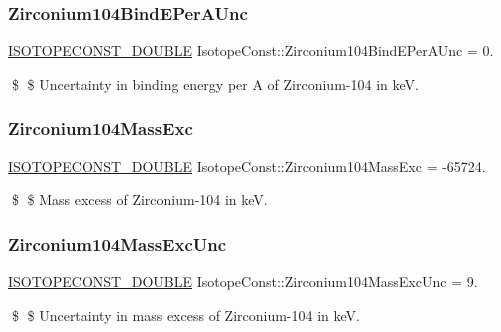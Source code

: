 \subsubsection{\texorpdfstring{Zirconium104\+Bind\+E\+Per\+A\+Unc}{Zirconium104BindEPerAUnc}}
{\footnotesize\ttfamily \mbox{\hyperlink{group___isotope_const-_macros_ga8f45a7272ce02c0b4c65c44636ed719a}{I\+S\+O\+T\+O\+P\+E\+C\+O\+N\+S\+T\+\_\+\+D\+O\+U\+B\+LE}} Isotope\+Const\+::\+Zirconium104\+Bind\+E\+Per\+A\+Unc = 0.}

\$ \$ Uncertainty in binding energy per A of Zirconium-\/104 in keV. \mbox{\label{group___isotope_const-_zirconium-_zr104_gabb92a5d2112276db6a3db04f9687df19}} 
\subsubsection{\texorpdfstring{Zirconium104\+Mass\+Exc}{Zirconium104MassExc}}
{\footnotesize\ttfamily \mbox{\hyperlink{group___isotope_const-_macros_ga8f45a7272ce02c0b4c65c44636ed719a}{I\+S\+O\+T\+O\+P\+E\+C\+O\+N\+S\+T\+\_\+\+D\+O\+U\+B\+LE}} Isotope\+Const\+::\+Zirconium104\+Mass\+Exc = -\/65724.}

\$ \$ Mass excess of Zirconium-\/104 in keV. \mbox{\label{group___isotope_const-_zirconium-_zr104_ga76b4bd2e6d50de9360b60f4271cba1a4}} 
\subsubsection{\texorpdfstring{Zirconium104\+Mass\+Exc\+Unc}{Zirconium104MassExcUnc}}
{\footnotesize\ttfamily \mbox{\hyperlink{group___isotope_const-_macros_ga8f45a7272ce02c0b4c65c44636ed719a}{I\+S\+O\+T\+O\+P\+E\+C\+O\+N\+S\+T\+\_\+\+D\+O\+U\+B\+LE}} Isotope\+Const\+::\+Zirconium104\+Mass\+Exc\+Unc = 9.}

\$ \$ Uncertainty in mass excess of Zirconium-\/104 in keV. \mbox{\label{group___isotope_const-_zirconium-_zr104_gac2281a6f0b27b172e77dc990d58aff46}} 
